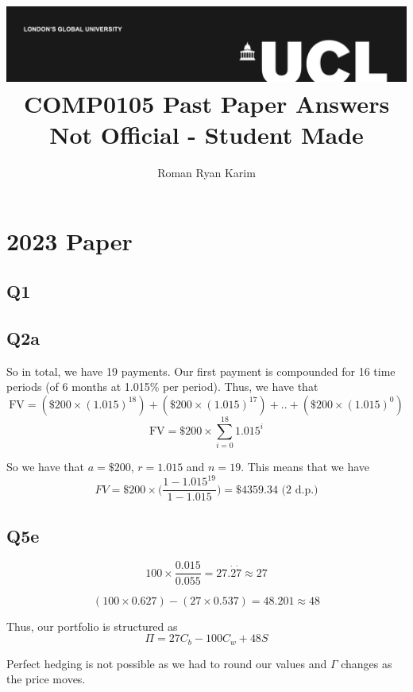 \documentclass[a4paper]{article}[10pt]
\title{{\vspace{-4em} \includegraphics[scale=0.4]{ucl_logo.png}}\\
{{\vspace{2em} \Huge COMP0105 Past Paper Answers}}\\
{\Large Not Official - Student Made}\\
}
\author{Roman Ryan Karim}
\begin{document}
 
\onehalfspacing
\maketitle
\setcounter{page}{1}

\newpage
\tableofcontents
\newpage

\section{2023 Paper}
\subsection*{Q1}
%

\subsection*{Q2a}
%
So in total, we have 19 payments. Our first payment is compounded for 16 time periods (of 6 months at 1.015\% per period). Thus, we have that
\begin{equation}
    \text{FV} = (\$200 \times (1.015)^{18}) + (\$200 \times (1.015)^{17}) + .. + (\$200 \times (1.015)^0)
\end{equation}
\begin{equation}
    \text{FV} = \$200 \times \sum^{18}_{i = 0} 1.015^i
\end{equation}

So we have that $a = \$200$, $r = 1.015$ and $n = 19$. This means that we have
\begin{equation}
    FV = \$200 \times \bigg( \frac{1 - 1.015^{19}}{1-1.015} \bigg) = \$4359.34 \text{ (2 d.p.)}
\end{equation}

\subsection*{Q5e}
\begin{equation*}
    100 \times \frac{0.015}{0.055} = 27.\dot{2}\dot{7} \approx 27
\end{equation*}

\begin{equation*}
    (100 \times 0.627) - (27 \times 0.537) = 48.201 \approx 48
\end{equation*}

Thus, our portfolio is structured as
\begin{equation*}
    \Pi = 27C_b - 100C_w + 48S
\end{equation*}

Perfect hedging is not possible as we had to round our values and $\Gamma$ changes as the price moves.
\end{document}
